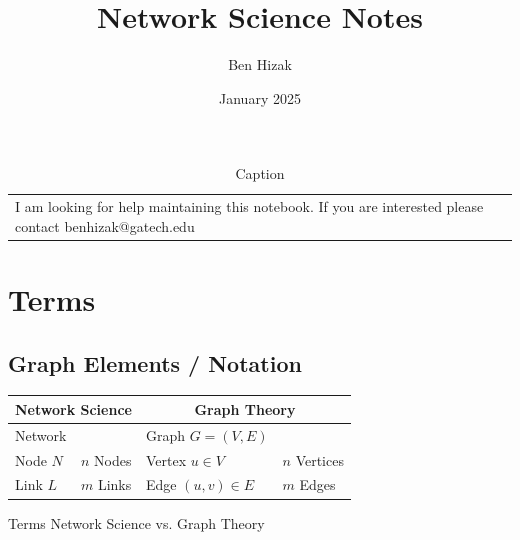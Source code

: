 \documentclass{article}
\title{Network Science Notes}
\author{Ben Hizak}
\date{January 2025}
\begin{document}
\maketitle 


\begin{table}
    \centering
    \begin{tabular}{l}
        I am looking for help maintaining this notebook. If you are interested please contact benhizak@gatech.edu\\
    \end{tabular}
    \caption{Caption}
    \label{tab:my_label}
\end{table}
\section{Terms}

\subsection{Graph Elements / Notation}

\begin{table}
\centering

\begin{tabular}{|l|l|l|l|}
\hline
\multicolumn{2}{|c|}{\textbf{Network Science}}& \multicolumn{2}{|c|}{\textbf{Graph Theory}}\\
\hline

\hline
Network  && Graph $G = (V, E)$ &\\
\hline
Node $N$ &$n$ Nodes& Vertex $u \in V$ &$n$ Vertices\\
\hline
Link $L$ &$m$ Links& Edge $(u, v) \in E$  &$m$ Edges\\
\hline

\end{tabular}

\end{table}

Terms Network Science vs. Graph Theory
\end{document}
